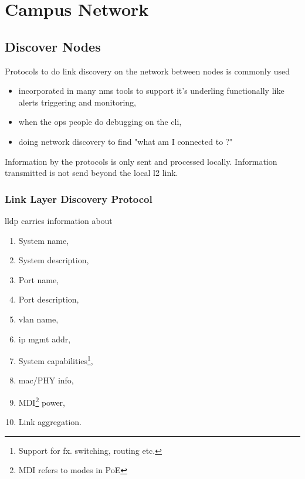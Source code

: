 \chapter{Campus Network}

\section{Discover Nodes}

Protocols to do link discovery on the network between nodes is commonly used
\begin{itemize}
    \item incorporated in many \gls{nms} tools to support it's underling functionally like alerts triggering and monitoring,
    \item when the ops people do debugging on the \gls{cli},
    \item doing network discovery to find "what am I connected to ?"
\end{itemize}

Information by the protocols is only sent and processed locally. Information transmitted is not send beyond the local \gls{l2} link.

\newpage

\subsection[LLDP]{Link Layer Discovery Protocol}


\gls{lldp} carries information about
\begin{enumerate}
    \item System name,
    \item System description,
    \item Port name,
    \item Port description,
    \item \gls{vlan} name,
    \item \gls{ip} mgmt addr,
    \item System capabilities\footnote{Support for fx. switching, routing etc.},
    \item \gls{mac}/PHY info,
    \item MDI\footnote{MDI refers to modes in PoE} power,
    \item Link aggregation.
\end{enumerate}

